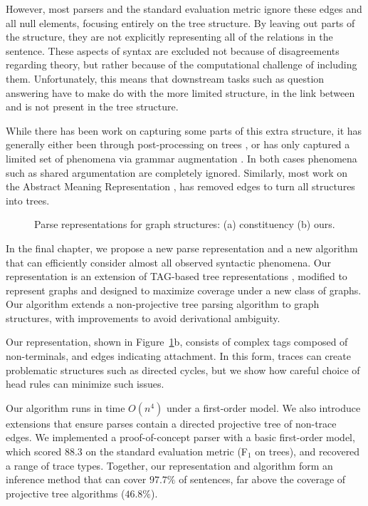 However, most parsers and the standard evaluation metric ignore these edges and all null elements, focusing entirely on the tree structure.
By leaving out parts of the structure, they are not explicitly representing all of the relations in the sentence.
These aspects of syntax are excluded not because of disagreements regarding theory, but rather because of the computational challenge of including them.
Unfortunately, this means that downstream tasks such as question answering have to make do with the more limited structure, \myeg in  the link between  and  is not present in the tree structure.

While there has been work on capturing some parts of this extra structure, it has generally either been through post-processing on trees \parencite{Johnson:2002,Jijkoun:2003,Campbell:2004,Levy:2004,Gabbard:2006}, or has only captured a limited set of phenomena via grammar augmentation \parencite{Collins:1997,dienes-dubey:2003,schmid:2006,cai-chiang-goldberg:2011}.
In both cases phenomena such as shared argumentation are completely ignored.
Similarly, most work on the Abstract Meaning Representation \parencite{amr}, has removed edges to turn all structures into trees.

\begin{figure}
  \centering
  \scalebox{1.0}{
    
  }
  \caption[Parse representations for graph structures.]{ \label{fig:repr}
    Parse representations for graph structures: (a) constituency (b) ours.
  }
\end{figure}

In the final chapter, we propose a new parse representation and a new algorithm that can efficiently consider almost all observed syntactic phenomena.
Our representation is an extension of TAG-based tree representations \parencite{cck,Shen:2007}, modified to represent graphs and designed to maximize coverage under a new class of graphs.
Our algorithm extends a non-projective tree parsing algorithm \parencite{ec} to graph structures, with improvements to avoid derivational ambiguity.

Our representation, shown in Figure~\ref{fig:repr}b, consists of complex tags composed of non-terminals, and edges indicating attachment.
In this form, traces can create problematic structures such as directed cycles, but we show how careful choice of head rules can minimize such issues.

Our algorithm runs in time $O(n^4)$ under a first-order model.
We also introduce extensions that ensure parses contain a directed projective tree of non-trace edges.
We implemented a proof-of-concept parser with a basic first-order model, which scored $88.3$ on the standard evaluation metric (F$_1$ on trees), and recovered a range of trace types.
Together, our representation and algorithm form an inference method that can cover $97.7\%$ of sentences, far above the coverage of projective tree algorithms ($46.8\%$).


